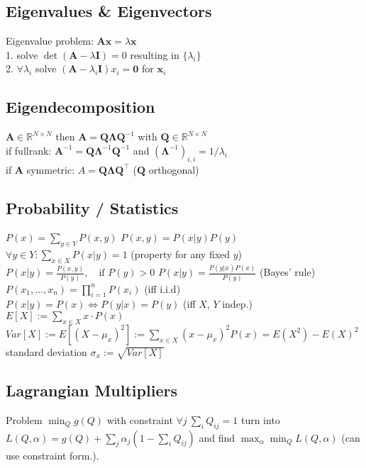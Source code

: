 \subsection*{Eigenvalues \& Eigenvectors}
Eigenvalue problem: $\mathbf{Ax}=\lambda\mathbf{x}$ \\
1. solve $\det(\mathbf{A} - \lambda \mathbf{I}) = 0$ resulting in $\{\lambda_i\}$ \\
2. $\forall \lambda_i$ solve $(\mathbf{A} - \lambda_i \mathbf{I})x_i = \mathbf{0}$ for $\mathbf{x}_i$

\subsection*{Eigendecomposition}
$\mathbf{A} \in \mathbb{R}^{N \times N}$ then $\mathbf{A} = \mathbf{Q} \boldsymbol{\Lambda} \mathbf{Q}^{-1}$ with $\mathbf{Q} \in \mathbb{R}^{N \times N}$\\
if fullrank: $\mathbf{A}^{-1} = \mathbf{Q} \boldsymbol{\Lambda}^{-1} \mathbf{Q}^{-1}$ and $(\boldsymbol{\Lambda}^{-1})_{i,i} = {1}/{\lambda_i}$\\
if $\mathbf{A}$ symmetric: $A = \mathbf{Q} \boldsymbol{\Lambda} \mathbf{Q^\top}$ ($\mathbf{Q}$ orthogonal)

\subsection*{Probability / Statistics}
$P(x) = \sum_{y \in Y} P(x, y)$ \quad
$P(x, y) = P(x|y) P(y)$ \\
$\forall y \in Y: \sum_{x \in X} P(x|y) = 1$ (property for any fixed $y$) \\
$P(x|y) = \frac{P(x,y)}{P(y)},\quad \text{if } P(y) > 0$ \quad
$P(x|y) = \frac{P(y|x)P(x)}{P(y)}$ (Bayes' rule) \quad
$P(x_1, \ldots, x_n) = \prod_{i=1}^n P(x_i)$ (iff i.i.d) \\
$P(x|y) = P(x) \Leftrightarrow P(y|x) = P(y)$ (iff $X$, $Y$ indep.) \\
$E[X]:=\sum_{x \in X}x\cdot P(x)$ \quad
$Var[X]:= E[(X-\mu_x)^2]:=\sum_{x \in X}(x-\mu_x)^2P(x)= E(X^2) - E(X)^2$ \\
standard deviation $\sigma_x := \sqrt{Var[X]}$

\subsection*{Lagrangian Multipliers}
Problem $\min_Q g(Q)$ with constraint $\forall j \ \sum_i Q_{ij}=1$ turn into $L(Q, \alpha) = g(Q)+\sum_j \alpha_j (1-\sum_i Q_{ij})$ and find $\max_\alpha \min_Q L(Q,\alpha)$ (can use constraint form.).

